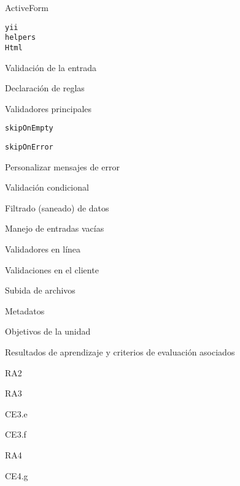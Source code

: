 \begin{longenum}
\begin{longenum}
\begin{longenum}
            \item ActiveForm
            \item \texttt{yii\\helpers\\Html}
        \end{longenum}
        \item Validación de la entrada
        \begin{longenum}
            \item Declaración de reglas
            \begin{longenum}
                \item Validadores principales
                \item \texttt{skipOnEmpty}
                \item \texttt{skipOnError}
                \item Personalizar mensajes de error
                \item Validación condicional
                \item Filtrado (saneado) de datos
                \item Manejo de entradas vacías
            \end{longenum}
            \item Validadores en línea
            \item Validaciones en el cliente \opcional\
        \end{longenum}
        \item Subida de archivos
        \item Metadatos
        \begin{longenum}
            \item Objetivos de la unidad
            \item Resultados de aprendizaje y criterios de evaluación asociados
            \begin{longenum}
                \item RA2
                \item RA3
                \begin{longenum}
                    \item CE3.e
                    \item CE3.f
                \end{longenum}
                \item RA4
                \begin{longenum}
                    \item CE4.g

\end{longenum}
\end{longenum}
\end{longenum}
\end{longenum}
\end{longenum}
